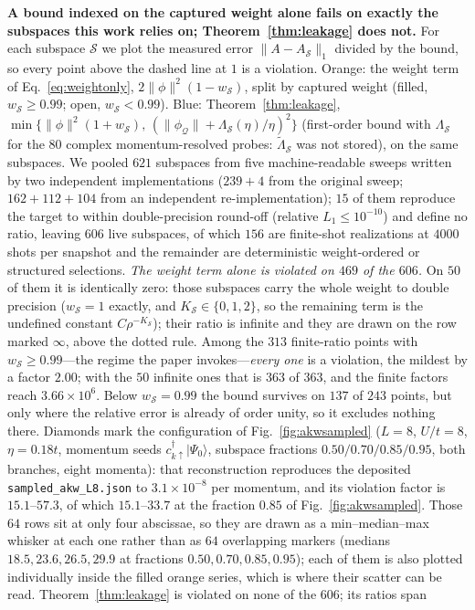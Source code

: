 \caption{\textbf{A bound indexed on the captured weight alone fails on exactly the subspaces this work relies on; Theorem~\ref{thm:leakage} does not.}
For each subspace $\mathcal S$ we plot the measured error $\|A-A_{\mathcal S}\|_1$ divided by the
bound, so every point above the dashed line at $1$ is a violation. Orange: the weight term of Eq.~\eqref{eq:weightonly}, $2\|\phi\|^{2}(1-w_{\mathcal S})$, split by captured weight (filled, $w_{\mathcal S}\ge
0.99$; open, $w_{\mathcal S}<0.99$). Blue: Theorem~\ref{thm:leakage}, $\min\{\|\phi\|^{2}(1+w_{\mathcal
S}),\,(\|\phi_{\mathcal Q}\|+\Lambda_{\mathcal S}(\eta)/\eta)^{2}\}$ (first-order bound with $\Lambda_{\mathcal S}$
for the $80$ complex momentum-resolved probes: $\tilde\Lambda_{\mathcal S}$ was not stored), on the same subspaces. We pooled $621$ subspaces from five machine-readable
sweeps written by two independent implementations ($239+4$ from the original sweep; $162+112+104$
from an independent re-implementation); $15$ of them reproduce the target to within double-precision
round-off (relative $L_1\le 10^{-10}$) and define no ratio, leaving $606$ live subspaces, of which
$156$ are finite-shot realizations at $4000$ shots per snapshot and the remainder are deterministic
weight-ordered or structured selections. \emph{The weight term alone is violated on $469$ of the $606$.} On $50$ of them it is identically zero: those subspaces carry the whole weight to double
precision ($w_{\mathcal S}=1$ exactly, and $K_{\mathcal S}\in\{0,1,2\}$, so the remaining term is the
undefined constant $C\rho^{-K_{\mathcal S}}$); their ratio is infinite and they are drawn on the row
marked $\infty$, above the dotted rule. Among the $313$ finite-ratio points with $w_{\mathcal S}\ge
0.99$---the regime the paper invokes---\emph{every one} is a violation, the mildest by a factor
$2.00$; with the $50$ infinite ones that is $363$ of $363$, and the finite factors reach
$3.66\times10^{6}$. Below $w_{\mathcal S}=0.99$ the bound survives on $137$ of $243$ points, but only
where the relative error is already of order unity, so it excludes nothing there. Diamonds mark the
configuration of Fig.~\ref{fig:akwsampled} ($L=8$, $U/t=8$, $\eta=0.18t$, momentum seeds
$c^{\dagger}_{k\uparrow}|\Psi_0\rangle$, subspace fractions $0.50/0.70/0.85/0.95$, both branches,
eight momenta): that reconstruction reproduces the deposited \texttt{sampled\_akw\_L8.json} to
$3.1\times10^{-8}$ per momentum, and its violation factor is $15.1$--$57.3$, of which $15.1$--$33.7$
at the fraction $0.85$ of Fig.~\ref{fig:akwsampled}. Those $64$ rows sit at only four abscissae, so they are drawn as a min--median--max whisker at each one rather than as $64$ overlapping markers (medians $18.5, 23.6, 26.5, 29.9$ at fractions $0.50, 0.70, 0.85, 0.95$); each of them is also plotted individually inside the filled orange series, which is where their scatter can be read. Theorem~\ref{thm:leakage} is violated on none of the $606$; its ratios span
}
